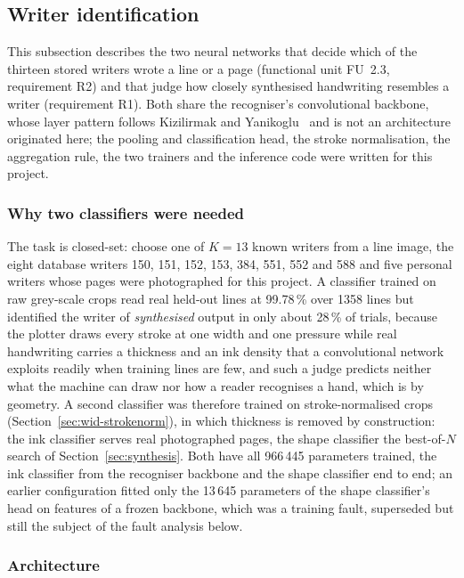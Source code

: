 \subsection{Writer identification}
\label{sec:writerid}

This subsection describes the two neural networks that decide which of the thirteen stored writers wrote a line or a page (functional unit FU~2.3, requirement R2) and that judge how closely synthesised handwriting resembles a writer (requirement R1).
Both share the recogniser's convolutional backbone, whose layer pattern follows Kizilirmak and Yanikoglu~\cite{kizilirmak2023} and is not an architecture originated here; the pooling and classification head, the stroke normalisation, the aggregation rule, the two trainers and the inference code were written for this project.

\subsubsection{Why two classifiers were needed}

The task is closed-set: choose one of $K=13$ known writers from a line image, the eight database writers 150, 151, 152, 153, 384, 551, 552 and 588 and five personal writers whose pages were photographed for this project.
A classifier trained on raw grey-scale crops read real held-out lines at 99.78\,\% over 1358 lines but identified the writer of \emph{synthesised} output in only about 28\,\% of trials, because the plotter draws every stroke at one width and one pressure while real handwriting carries a thickness and an ink density that a convolutional network exploits readily when training lines are few, and such a judge predicts neither what the machine can draw nor how a reader recognises a hand, which is by geometry.
A second classifier was therefore trained on stroke-normalised crops (Section~\ref{sec:wid-strokenorm}), in which thickness is removed by construction: the ink classifier serves real photographed pages, the shape classifier the best-of-$N$ search of Section~\ref{sec:synthesis}.
Both have all 966\,445 parameters trained, the ink classifier from the recogniser backbone and the shape classifier end to end; an earlier configuration fitted only the 13\,645 parameters of the shape classifier's head on features of a frozen backbone, which was a training fault, superseded but still the subject of the fault analysis below.

\subsubsection{Architecture}

